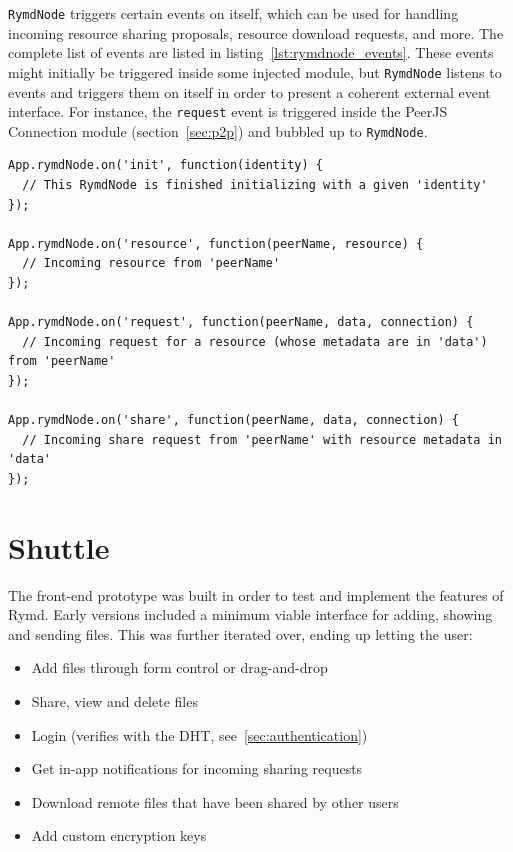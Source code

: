 \texttt{RymdNode} triggers certain events on itself, which can be used for handling incoming resource sharing proposals, resource download requests, and more. The complete list of events are listed in listing~\ref{lst:rymdnode_events}. These events might initially be triggered inside some injected module, but \texttt{RymdNode} listens to events and triggers them on itself in order to present a coherent external event interface. For instance, the \texttt{request} event is triggered inside the PeerJS Connection module (section~\ref{sec:p2p}) and bubbled up to \texttt{RymdNode}.

\begin{Code}
\begin{lstlisting}[caption={Events triggered on \texttt{RymdNode}}, label={lst:rymdnode_events}]
App.rymdNode.on('init', function(identity) {
  // This RymdNode is finished initializing with a given 'identity'
});

App.rymdNode.on('resource', function(peerName, resource) {
  // Incoming resource from 'peerName'
});

App.rymdNode.on('request', function(peerName, data, connection) {
  // Incoming request for a resource (whose metadata are in 'data') from 'peerName'
});

App.rymdNode.on('share', function(peerName, data, connection) {
  // Incoming share request from 'peerName' with resource metadata in 'data'
});
\end{lstlisting}
\end{Code}

\section{Shuttle}
\label{sec:shuttle}
The front-end prototype was built in order to test and implement the features of Rymd. Early versions included a minimum viable interface for adding, showing and sending files. This was further iterated over, ending up letting the user:

\begin{itemize}
  \item Add files through form control or drag-and-drop
  \item Share, view and delete files
  \item Login (verifies with the DHT, see~\ref{sec:authentication})
  \item Get in-app notifications for incoming sharing requests
  \item Download remote files that have been shared by other users
  \item Add custom encryption keys
\end{itemize}

